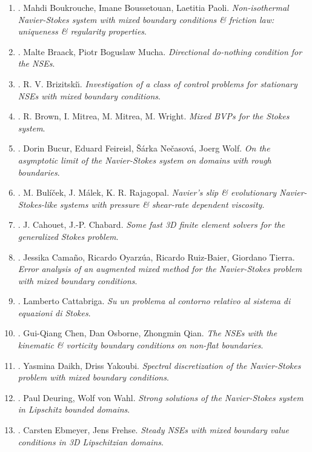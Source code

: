 \documentclass{article}
\begin{document}
\begin{enumerate}
	\item \cite{Boukrouche_Boussetouan_Paoli2014}. {\sc Mahdi Boukrouche, Imane Boussetouan, Laetitia Paoli}. {\it Non-isothermal Navier-Stokes system with mixed boundary conditions \& friction law: uniqueness \& regularity properties}.
	\item \cite{Braack_Mucha2014}. {\sc Malte Braack, Piotr Boguslaw Mucha}. {\it Directional do-nothing condition for the NSEs}.
	\item \cite{Brizitskii2009}. {\sc R. V. Brizitski\u{\i}}. {\it Investigation of a class of control problems for stationary NSEs with mixed boundary conditions}.
	\item \cite{Brown_Mitrea_Mitrea_Wright2010}. {\sc R. Brown, I. Mitrea, M. Mitrea, M. Wright}. {\it Mixed BVPs for the Stokes system}.
	\item \cite{Bucur_Feireisl_Necasova_Wolf2008}. {\sc Dorin Bucur, Eduard Feireisl, \v{S}\'{a}rka Ne\v{c}asov\'{a}, Joerg Wolf}. {\it On the asymptotic limit of the Navier-Stokes system on domains with rough boundaries}.
	\item \cite{Bulicek_Malek_Rajagopal2007}. {\sc M. Bul\'{i}\v{c}ek, J. M\'{a}lek, K. R. Rajagopal}. {\it Navier's slip \& evolutionary {N}avier-{S}tokes-like systems with pressure \& shear-rate dependent viscosity}.
	\item \cite{Cahouet_Chabard1988}. {\sc J. Cahouet, J.-P. Chabard}. {\it Some fast 3D finite element solvers for the generalized Stokes problem}.
	\item \cite{Camano_Oyarzua_Ruiz-Baier_Tierra2018}. {\sc Jessika Cama\~{n}o, Ricardo Oyarz\'{u}a,  Ricardo Ruiz-Baier, Giordano Tierra}. {\it Error analysis of an augmented mixed method for the Navier-Stokes problem with mixed boundary conditions}.
	\item \cite{Cattabriga1961}. {\sc Lamberto Cattabriga}. {\it Su un problema al contorno relativo al sistema di equazioni di Stokes}.
	\item \cite{Chen_Osborne_Qian2009}. {\sc Gui-Qiang Chen, Dan Osborne, Zhongmin Qian}. {\it The NSEs with the kinematic \& vorticity boundary conditions on non-flat boundaries}.
	\item \cite{Daikh_Yakoubi2017}. {\sc Yasmina Daikh, Driss Yakoubi}. {\it Spectral discretization of the Navier-Stokes problem with mixed boundary conditions}.
	\item \cite{Deuring_von-Walh1995}. {\sc Paul Deuring, Wolf von Wahl}. {\it Strong solutions of the Navier-Stokes system in Lipschitz bounded domains}.
	\item \cite{Ebmeyer_Frehse2001}. {\sc Carsten Ebmeyer, Jens Frehse}. {\it Steady NSEs with mixed boundary value conditions in 3D Lipschitzian domains}.

\end{enumerate}
\end{document}
